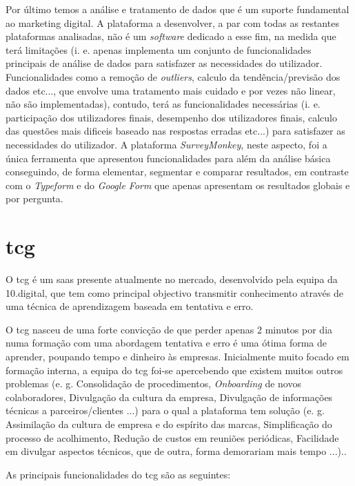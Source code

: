 Por último temos a análise e tratamento de dados que é um suporte fundamental ao marketing digital. A plataforma a desenvolver, a par com todas as restantes plataformas analisadas, não é um \textit{software} dedicado a esse fim, na medida que terá limitações (i. e. apenas implementa um conjunto de funcionalidades principais de análise de dados para satisfazer as necessidades do utilizador. Funcionalidades como a remoção de \textit{outliers}, calculo da tendência/previsão dos dados etc..., que envolve uma tratamento mais cuidado e por vezes não linear, não são implementadas), contudo, terá as funcionalidades necessárias (i. e. participação dos utilizadores finais, desempenho dos utilizadores finais, calculo das questões mais dificeis baseado nas respostas erradas etc...) para satisfazer as necessidades do utilizador. A plataforma \textit{SurveyMonkey}, neste aspecto, foi a única ferramenta que apresentou funcionalidades para além da análise básica conseguindo, de forma elementar, segmentar e comparar resultados, em contraste com o \textit{Typeform} e do \textit{Google Form} que apenas apresentam os resultados globais e por pergunta.

\section{\acrfull{tcg}}
\label{sec:TCGM}

O \acrlong{tcg} é um \acrshort{saas} presente atualmente no mercado, desenvolvido pela equipa da 10.digital, que tem como principal objectivo transmitir conhecimento através de uma técnica de aprendizagem baseada em tentativa e erro.


 O \acrshort{tcg} nasceu de uma forte convicção de que perder apenas 2 minutos por dia numa formação com uma abordagem tentativa e erro é uma ótima forma de aprender, poupando tempo e dinheiro às empresas. Inicialmente muito focado em formação interna, a equipa do \acrshort{tcg} foi-se apercebendo que existem muitos outros problemas (e. g. Consolidação de procedimentos, \textit{Onboarding} de novos colaboradores, Divulgação da cultura da empresa, Divulgação de informações técnicas a parceiros/clientes ...) para o qual a plataforma tem solução (e. g. Assimilação da cultura de empresa e do espírito das marcas, Simplificação do processo de acolhimento, Redução de custos em reuniões periódicas, Facilidade em divulgar aspectos técnicos, que de outra, forma demorariam mais tempo ...).\cite{tcginfo}. 
 
 As principais funcionalidades do  \acrshort{tcg}  são as seguintes:



